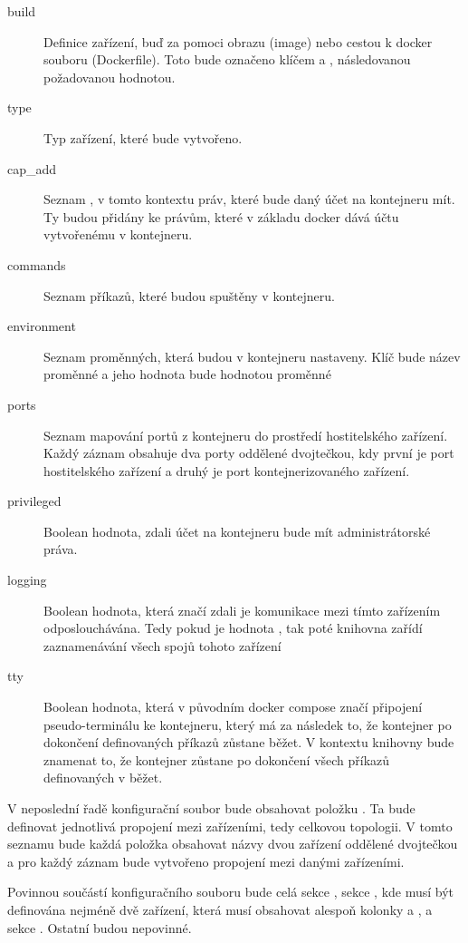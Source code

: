 \begin{description}
    \item[build] Definice zařízení, buď za pomoci obrazu (image) nebo cestou k docker souboru (Dockerfile). Toto bude označeno klíčem  a , následovanou požadovanou hodnotou.
    \item[type] Typ zařízení, které bude vytvořeno. 
    \item[cap\_add] Seznam , v tomto kontextu práv, které bude daný účet na kontejneru mít. Ty budou přidány ke právům, které v základu docker dává účtu vytvořenému v kontejneru. 
    \item[commands] Seznam příkazů, které budou spuštěny v kontejneru.
    \item[environment] Seznam proměnných, která budou v kontejneru nastaveny. Klíč bude název proměnné a jeho hodnota bude hodnotou proměnné
    \item[ports] Seznam mapování portů z kontejneru do prostředí hostitelského zařízení. Každý záznam obsahuje dva porty oddělené dvojtečkou, kdy první je port hostitelského zařízení a druhý je port kontejnerizovaného zařízení.
    \item[privileged] Boolean hodnota, zdali účet na kontejneru bude mít administrátorské práva.
    \item[logging] Boolean hodnota, která značí zdali je komunikace mezi tímto zařízením odposlouchávána. Tedy pokud je hodnota , tak poté knihovna zařídí zaznamenávání všech spojů tohoto zařízení
    \item[tty] Boolean hodnota, která v původním docker compose značí připojení pseudo-terminálu ke kontejneru, který má za následek to, že kontejner po dokončení definovaných příkazů zůstane běžet. V kontextu knihovny bude znamenat to, že kontejner zůstane po dokončení všech příkazů definovaných v  běžet. 
\end{description}

V neposlední řadě konfigurační soubor bude obsahovat položku . Ta bude definovat jednotlivá propojení mezi zařízeními, tedy celkovou topologii. V tomto seznamu bude každá položka obsahovat názvy dvou zařízení oddělené dvojtečkou a pro každý záznam bude vytvořeno propojení mezi danými zařízeními.

Povinnou součástí konfiguračního souboru bude celá sekce , sekce , kde musí být definována nejméně dvě zařízení, která musí obsahovat alespoň kolonky  a , a sekce . Ostatní budou nepovinné. 

